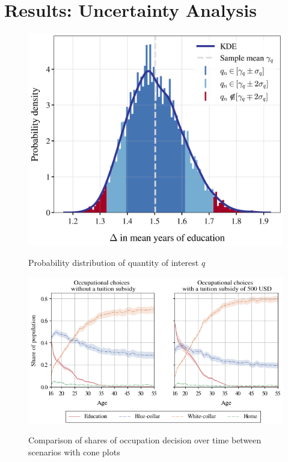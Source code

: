 \documentclass[a4paper,12pt]{article}
\begin{document}
\newpage
\section{Results: Uncertainty Analysis}

\begin{figure}[H]
	\caption{Probability distribution of quantity of interest $q$}
	\centering
	\includegraphics[scale=0.7]{../../../scrypy/figures/distplot}
	\label{fig:dist}
\end{figure}

\begin{figure}[H]
	\caption{Comparison of shares of occupation decision over time between scenarios with cone plots}
	\centering
	\includegraphics[scale=0.75]{../../../scrypy/figures/cone_plot_choice_shares}
	\label{fig:paths}
\end{figure}
\end{document}
